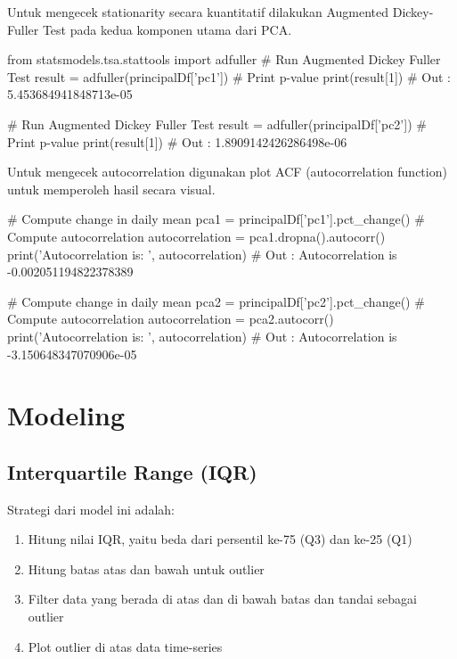         Untuk mengecek stationarity secara kuantitatif dilakukan Augmented Dickey-Fuller Test pada kedua komponen utama dari PCA.

\begin{python}
from statsmodels.tsa.stattools import adfuller
# Run Augmented Dickey Fuller Test
result = adfuller(principalDf['pc1'])
# Print p-value
print(result[1])
# Out : 5.453684941848713e-05

# Run Augmented Dickey Fuller Test
result = adfuller(principalDf['pc2'])
# Print p-value
print(result[1])
# Out : 1.8909142426286498e-06
\end{python}

        Untuk mengecek autocorrelation digunakan plot ACF (autocorrelation function) untuk memperoleh hasil secara visual.

\begin{python}
# Compute change in daily mean 
pca1 = principalDf['pc1'].pct_change()
# Compute autocorrelation
autocorrelation = pca1.dropna().autocorr()
print('Autocorrelation is: ', autocorrelation)
# Out : Autocorrelation is -0.002051194822378389

# Compute change in daily mean 
pca2 = principalDf['pc2'].pct_change()
# Compute autocorrelation
autocorrelation = pca2.autocorr()
print('Autocorrelation is: ', autocorrelation)
# Out : Autocorrelation is -3.150648347070906e-05
\end{python}

\section{Modeling}

    \subsection{Interquartile Range (IQR)}

    Strategi dari model ini adalah: \cite{metode_acuan}

    \begin{enumerate}
        \item Hitung nilai IQR, yaitu beda dari persentil ke-75 (Q3) dan ke-25 (Q1)
        \item Hitung batas atas dan bawah untuk outlier
        \item Filter data yang berada di atas dan di bawah batas dan tandai sebagai outlier
        \item Plot outlier di atas data time-series
    \end{enumerate}

